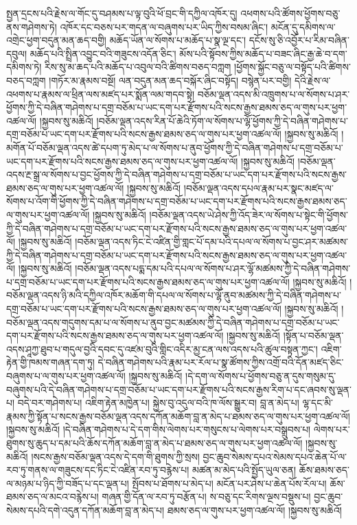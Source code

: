 སྤྱན་དྲངས་པའི་རྗེས་ལ་གོང་དུ་བཤམས་པ་ལྟ་བུའི་ཕོ་བྲང་གི་དཀྱིལ་འཁོར་དུ། འཕགས་པའི་ཚོགས་ཕྱོགས་བཅུ་ནས་གཤེགས་ཏེ། འཁོར་དང་བཅས་པར་གདན་ལ་བཞུགས་པར་ཡིད་ཀྱིས་བསམ་ཞིང་། མངོན་དུ་དམིགས་ལ་འགྲེང་ཕྱག་བདུན་མན་ཆད་བགྱི། མཆོད་ཡོན་ལ་སོགས་པ་མཆོད་པ་སྣ་ལྔ་དང་། དངོས་སུ་ཅི་འབྱོར་པ་རིམ་བཞིན་དབུལ། མཆོད་པའི་སྤྲིན་འབྱུང་བའི་གཟུངས་འདོན་ཅིང་། མོས་པའི་སྟོབས་ཀྱིས་མཆོད་པ་བཟང་ཞིང་རྒྱ་ཆེ་བ་དག་དམིགས་ཏེ། རིས་སུ་མ་ཆད་པའི་མཆོད་པ་འབུལ་བའི་ཚིགས་བཅད་བཀླག །ཕྱོགས་སྐྱོང་བཅུ་ལ་བསྟོད་པའི་ཚིགས་བཅད་བཀླག །གཏོར་མ་རྣམས་བསྔོ། ལན་བདུན་མན་ཆད་བསྐོར་ཞིང་བསྟོད། བསྙེན་པར་བགྱི། དེའི་རྗེས་ལ་འཕགས་པ་རྣམས་ལ་ཕྲིན་ལས་མཛད་པར་སྨོན་ལམ་གདབ་སྟེ། བཅོམ་ལྡན་འདས་མི་འཁྲུགས་པ་ལ་སོགས་པ་ཤར་ཕྱོགས་ཀྱི་དེ་བཞིན་གཤེགས་པ་དགྲ་བཅོམ་པ་ཡང་དག་པར་རྫོགས་པའི་སངས་རྒྱས་ཐམས་ཅད་ལ་གུས་པར་ཕྱག་འཚལ་ལོ། །སྐྱབས་སུ་མཆིའོ། །བཅོམ་ལྡན་འདས་རིན་པོ་ཆེའི་ཏོག་ལ་སོགས་པ་ལྷོ་ཕྱོགས་ཀྱི་དེ་བཞིན་གཤེགས་པ་དགྲ་བཅོམ་པ་ཡང་དག་པར་རྫོགས་པའི་སངས་རྒྱས་ཐམས་ཅད་ལ་གུས་པར་ཕྱག་འཚལ་ལོ། །སྐྱབས་སུ་མཆིའོ། །མགོན་པོ་བཅོམ་ལྡན་འདས་ཚེ་དཔག་ཏུ་མེད་པ་ལ་སོགས་པ་ནུབ་ཕྱོགས་ཀྱི་དེ་བཞིན་གཤེགས་པ་དགྲ་བཅོམ་པ་ཡང་དག་པར་རྫོགས་པའི་སངས་རྒྱས་ཐམས་ཅད་ལ་གུས་པར་ཕྱག་འཚལ་ལོ། །སྐྱབས་སུ་མཆིའོ། །བཅོམ་ལྡན་འདས་རྔ་སྒྲ་ལ་སོགས་པ་བྱང་ཕྱོགས་ཀྱི་དེ་བཞིན་གཤེགས་པ་དགྲ་བཅོམ་པ་ཡང་དག་པར་རྫོགས་པའི་སངས་རྒྱས་ཐམས་ཅད་ལ་གུས་པར་ཕྱག་འཚལ་ལོ། །སྐྱབས་སུ་མཆིའོ། །བཅོམ་ལྡན་འདས་དཔལ་རྣམ་པར་སྣང་མཛད་ལ་སོགས་པ་འོག་གི་ཕྱོགས་ཀྱི་དེ་བཞིན་གཤེགས་པ་དགྲ་བཅོམ་པ་ཡང་དག་པར་རྫོགས་པའི་སངས་རྒྱས་ཐམས་ཅད་ལ་གུས་པར་ཕྱག་འཚལ་ལོ། །སྐྱབས་སུ་མཆིའོ། །བཅོམ་ལྡན་འདས་ཡེ་ཤེས་ཀྱི་འོད་ཟེར་ལ་སོགས་པ་སྟེང་གི་ཕྱོགས་ཀྱི་དེ་བཞིན་གཤེགས་པ་དགྲ་བཅོམ་པ་ཡང་དག་པར་རྫོགས་པའི་སངས་རྒྱས་ཐམས་ཅད་ལ་གུས་པར་ཕྱག་འཚལ་ལོ། །སྐྱབས་སུ་མཆིའོ། །བཅོམ་ལྡན་འདས་ཏིང་ངེ་འཛིན་གྱི་གླང་པོ་དམ་པའི་དཔལ་ལ་སོགས་པ་བྱང་ཤར་མཚམས་ཀྱི་དེ་བཞིན་གཤེགས་པ་དགྲ་བཅོམ་པ་ཡང་དག་པར་རྫོགས་པའི་སངས་རྒྱས་ཐམས་ཅད་ལ་གུས་པར་ཕྱག་འཚལ་ལོ། །སྐྱབས་སུ་མཆིའོ། །བཅོམ་ལྡན་འདས་པདྨ་དམ་པའི་དཔལ་ལ་སོགས་པ་ཤར་ལྷོ་མཚམས་ཀྱི་དེ་བཞིན་གཤེགས་པ་དགྲ་བཅོམ་པ་ཡང་དག་པར་རྫོགས་པའི་སངས་རྒྱས་ཐམས་ཅད་ལ་གུས་པར་ཕྱག་འཚལ་ལོ། །སྐྱབས་སུ་མཆིའོ། །བཅོམ་ལྡན་འདས་ཉི་མའི་དཀྱིལ་འཁོར་མཆོག་གི་དཔལ་ལ་སོགས་པ་ལྷོ་ནུབ་མཚམས་ཀྱི་དེ་བཞིན་གཤེགས་པ་དགྲ་བཅོམ་པ་ཡང་དག་པར་རྫོགས་པའི་སངས་རྒྱས་ཐམས་ཅད་ལ་གུས་པར་ཕྱག་འཚལ་ལོ། །སྐྱབས་སུ་མཆིའོ། །བཅོམ་ལྡན་འདས་གདུགས་དམ་པ་ལ་སོགས་པ་ནུབ་བྱང་མཚམས་ཀྱི་དེ་བཞིན་གཤེགས་པ་དགྲ་བཅོམ་པ་ཡང་དག་པར་རྫོགས་པའི་སངས་རྒྱས་ཐམས་ཅད་ལ་གུས་པར་ཕྱག་འཚལ་ལོ། །སྐྱབས་སུ་མཆིའོ། །སྟོན་པ་བཅོམ་ལྡན་འདས་ཤཱཀྱ་ཐུབ་པ་གདུལ་བྱའི་དབང་དུ་འཛམ་བུའི་གླིང་འདིར་མྱ་ངན་ལས་འདས་པའི་ཚུལ་བསྟན་ཀྱང་། འཇིག་རྟེན་གྱི་ཁམས་གཞན་དག་ཏུ། དེ་བཞིན་གཤེགས་པའི་རྣམ་པར་རོལ་པ་སྣ་ཚོགས་ཀྱིས་འགྲོ་བའི་དོན་མཛད་ཅིང་བཞུགས་པ་ལ་གུས་པར་ཕྱག་འཚལ་ལོ། །སྐྱབས་སུ་མཆིའོ། །དེ་དག་ལ་སོགས་པ་ཕྱོགས་བཅུ་ན་དུས་གསུམ་དུ་བཞུགས་པའི་དེ་བཞིན་གཤེགས་པ་དགྲ་བཅོམ་པ་ཡང་དག་པར་རྫོགས་པའི་སངས་རྒྱས་རིག་པ་དང་ཞབས་སུ་ལྡན་པ། བདེ་བར་གཤེགས་པ། འཇིག་རྟེན་མཁྱེན་པ། སྐྱེས་བུ་འདུལ་བའི་ཁ་ལོས་སྒྱུར་བ། བླ་ན་མེད་པ། ལྷ་དང་མི་རྣམས་ཀྱི་སྟོན་པ་སངས་རྒྱས་བཅོམ་ལྡན་འདས་དཀོན་མཆོག་བླ་ན་མེད་པ་ཐམས་ཅད་ལ་གུས་པར་ཕྱག་འཚལ་ལོ། །སྐྱབས་སུ་མཆིའོ། །དེ་བཞིན་གཤེགས་པ་དེ་དག་གིས་ལེགས་པར་གསུངས་པ་ལེགས་པར་བསྒྲུབས་པ། ལེགས་པར་ཐུགས་སུ་ཆུད་པ་དམ་པའི་ཆོས་དཀོན་མཆོག་བླ་ན་མེད་པ་ཐམས་ཅད་ལ་གུས་པར་ཕྱག་འཚལ་ལོ། །སྐྱབས་སུ་མཆིའོ། །སངས་རྒྱས་བཅོམ་ལྡན་འདས་དེ་དག་གི་ཐུགས་ཀྱི་སྲས། བྱང་ཆུབ་སེམས་དཔའ་སེམས་དཔའ་ཆེན་པོ་ལ་རབ་ཏུ་གནས་ལ་གཟུངས་དང་ཏིང་ངེ་འཛིན་རབ་ཏུ་བརྙེས་པ། མཚན་མ་མེད་པའི་སྤྱོད་ཡུལ་ཅན། ཆོས་ཐམས་ཅད་ལ་མཉམ་པ་ཉིད་ཀྱི་བཟོད་པ་དང་ལྡན་པ། སྤོབས་པ་ཐོགས་པ་མེད་པ། མངོན་པར་ཤེས་པ་ཆེན་པོས་རོལ་པ། ཆོས་ཐམས་ཅད་ལ་མངའ་བརྙེས་པ། གཞན་གྱི་དོན་ལ་རབ་ཏུ་བརྩོན་པ། ས་བཅུ་དང་རིགས་ལྔས་བསྡུས་པ། བྱང་ཆུབ་སེམས་དཔའི་དགེ་འདུན་དཀོན་མཆོག་བླ་ན་མེད་པ། ཐམས་ཅད་ལ་གུས་པར་ཕྱག་འཚལ་ལོ། །སྐྱབས་སུ་མཆིའོ། 